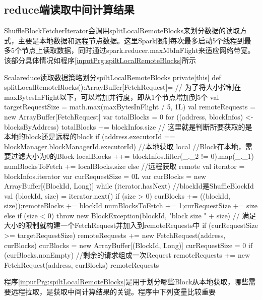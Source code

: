 \subsection{reduce端读取中间计算结果}
ShuffleBlockFetcherIterator会调用splitLocalRemoteBlocks来划分数据的读取方式，主要是本地数据和远程节点数据。这里Spark限制每次最多启动5个线程到最多5个节点上读取数据，同时通过spark.reducer.maxMbInFlight来适应网络带宽。该部分具体情况如程序\ref{inputPrg:spiltLocalRemoteBlocks}所示
\begin{codeInput}{Scala}{reduce读取数据策略划分}{spiltLocalRemoteBlocks}
private[this] def splitLocalRemoteBlocks():ArrayBuffer[FetchRequest]={
  // 为了将大小控制在maxBytesInFlight以下，可以增加并行度，即从1个节点增加到5个
  val targetRequestSize = math.max(maxBytesInFlight / 5, 1L)
  val remoteRequests = new ArrayBuffer[FetchRequest]
  var totalBlocks = 0
  for ((address, blockInfos) <- blocksByAddress) {
    totalBlocks += blockInfos.size
    // 这里就是判断所要获取的是本地的block还是远程的block
    if (address.executorId == blockManager.blockManagerId.executorId) {//本地获取 local
    //Block在本地，需要过滤大小为0的Block
    localBlocks ++= blockInfos.filter(_._2 != 0).map(_._1)
    numBlocksToFetch += localBlocks.size
    } else {//远程获取 remote
      val iterator = blockInfos.iterator
      var curRequestSize = 0L
      var curBlocks = new ArrayBuffer[(BlockId, Long)]
      while (iterator.hasNext) {//blockId是ShuffleBlockId
        val (blockId, size) = iterator.next()
        if (size > 0) {
          curBlocks += ((blockId, size));remoteBlocks += blockId
          numBlocksToFetch += 1;curRequestSize += size
        } else if (size < 0) {
          throw new BlockException(blockId, "block size " + size)
        }
    // 满足大小的限制就构建一个FetchRequest并加入到remoteRequests中
        if (curRequestSize >= targetRequestSize) {
          remoteRequests += new FetchRequest(address, curBlocks)
          curBlocks = new ArrayBuffer[(BlockId, Long)]
          curRequestSize = 0
        }
      }
      if (curBlocks.nonEmpty) {//剩余的请求组成一次Request
        remoteRequests += new FetchRequest(address, curBlocks)
      }
    }
  }
  remoteRequests
}
\end{codeInput}
程序\ref{inputPrg:spiltLocalRemoteBlocks}是用于划分哪些Block从本地获取，哪些需要远程拉取，是获取中间计算结果的关键。程序中下列变量比较重要

